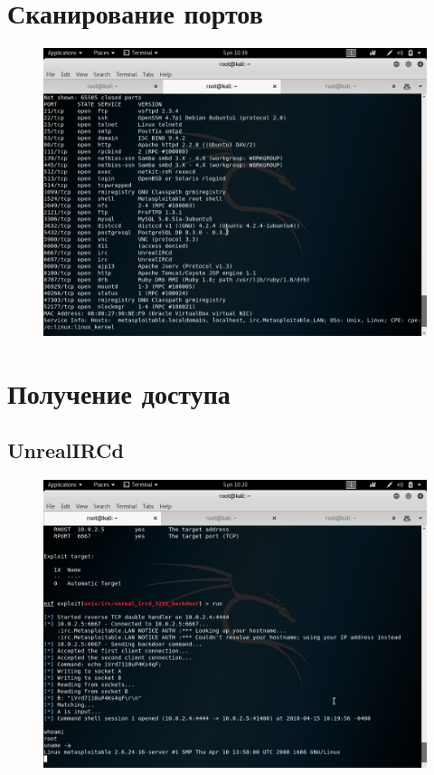\section{Сканирование портов}

\begin{figure}[H]
	\includegraphics[width=\textwidth]{images/nmap.png}
\end{figure}


\section{Получение доступа}

\subsection{UnrealIRCd}

\begin{figure}[H]
	\includegraphics[width=\textwidth]{images/ircd.png}
\end{figure}

